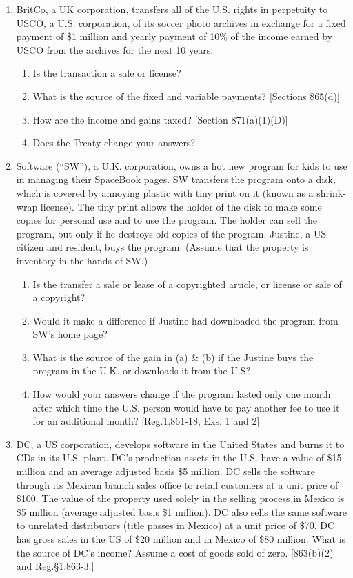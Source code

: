 \begin{select}
\begin{enumerate}
	\item BritCo, a UK corporation, transfers all of the U.S. rights in perpetuity to USCO, a U.S. corporation, of its soccer photo archives in exchange for a fixed payment of \$1 million and yearly payment of 10\% of the income earned by USCO from the archives for the next 10 years.
		\begin{enumerate}  
			\item Is the transaction a sale or license?
			\item What is the source of the fixed and variable payments? [Sections 865(d)]
			
			\item How are the income and gains taxed? [Section 871(a)(1)(D)]
			
			\item Does the Treaty change your answers?
		\end{enumerate}  
	
		\item Software (``SW''), a U.K. corporation, owns a hot new program for kids to use in managing their SpaceBook pages.  SW transfers the program onto a disk, which is covered by annoying plastic with tiny print on it (known as a shrink-wrap license).  The tiny print allows the holder of the disk to make some copies for personal use and to use the program.  The holder can sell the program, but only if he destroys old copies of the program.  Justine, a US citizen and resident, buys the program.  (Assume that the property is inventory in the hands of SW.)
			\begin{enumerate}
				\item Is the transfer a sale or lease of a copyrighted article, or license or sale of a copyright?
				\item Would it make a difference if Justine had downloaded the program from SW's home page?	
				\item What is the source of the gain in (a) \& (b) if the Justine buys the program in the U.K. or downloads it from the U.S?
				\item How would your answers change if the program lasted only one month after which time the U.S. person would have to pay another fee to use it for an additional month?  [Reg.\@ 1.861-18, Exs. 1 and 2]
				\end{enumerate}
				
					\item DC, a US corporation, develops software in the United States and burns it to CDs in its U.S. plant.  DC's production assets in the U.S. have a value of \$15 million and an average adjusted basis \$5 million.  DC sells the software through its Mexican branch sales office to retail customers at a unit price of \$100.  The value of the property used solely in the selling process in Mexico is \$5 million (average adjusted basis \$1 million).  DC also sells the same software to unrelated distributors (title passes in Mexico) at a unit price of \$70.  DC has gross sales in the US of \$20 million and in Mexico of \$80 million.  What is the source of DC's income?  Assume a cost of goods sold of zero. [863(b)(2) and Reg.\@ \S 1.863-3.]    
	

\end{enumerate}
\end{select}
